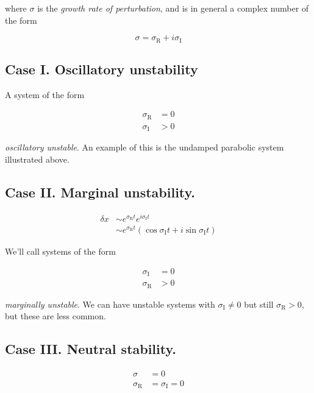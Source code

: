 where $\sigma$ is the \textit{growth rate of perturbation}, and is in general a complex number of the form

\begin{equation}\label{eqn:continuumL21:30}
\sigma = \sigma_\text{R} + i \sigma_\text{I}
\end{equation}

\subsection{Case I.  Oscillatory unstability}

A system of the form

\begin{align*}
\sigma_{\text{R}} &= 0 \\
\sigma_{\text{I}} &> 0
\end{align*}

\textit{oscillatory unstable}.  An example of this is the undamped parabolic system illustrated above.

\subsection{Case II.  Marginal unstability.}

\begin{align*}
\delta x 
&\sim e^{\sigma_{\text{R}} t} e^{i \sigma_{\text{I}} t} \\
&\sim e^{\sigma_{\text{R}} t} \left( \cos \sigma_{\text{I}} t + i \sin \sigma_{\text{I}} t \right)
\end{align*}

We'll call systems of the form

\begin{align*}
\sigma_{\text{I}} &= 0 \\
\sigma_{\text{R}} &> 0
\end{align*}

\textit{marginally unstable}.  We can have unstable systems with $\sigma_{\text{I}} \ne 0$ but still $\sigma_{\text{R}} > 0$, but these are less common.

\subsection{Case III.  Neutral stability.}

\begin{align*}
\sigma &= 0 \\
\sigma_{\text{R}} &= \sigma_{\text{I}} = 0
\end{align*}

